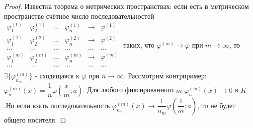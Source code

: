 \documentclass[9pt, a4paper]{article}
\begin{document}
			\begin{proof}
				Известна теорема о метрических пространствах: если есть в метрическом пространстве счётное число последовательностей 
				$\begin{matrix}
					\varphi_1^{(1)} & \varphi_2^{(1)} & \dots & \varphi_n^{(1)} & \to & \varphi^{(1)} \\
					\varphi_1^{(2)} & \varphi_2^{(2)} & \dots & \varphi_n^{(2)} & \to & \varphi^{(2)}\\
					\dots & \dots & \dots & \dots & \dots & \dots \\
					\varphi_1^{(m)} & \varphi_2^{(m)} & \dots & \varphi_n^{(m)} & \to & \varphi^{(m)}\\
					\dots & \dots & \dots & \dots & \dots & \dots \\
				\end{matrix}$
				таких, что $\varphi^{(m)} \to \varphi$ при $m\to \infty$, то $\exists \{\varphi_{n_m}^{(m)}\}$ - сходящаяся к $\varphi$ при $n \to \infty$. Рассмотрим контрпример: $\varphi_n^{(m)}(x) = \dfrac{1}{n}\varphi(\dfrac{x}{m};a )$. Для любого фиксированного $m$ $\varphi_n^{(m)} (x) \to 0$ в $K$.Но если взять последовательность $\varphi_{n_m}^{(m)}(x) \to \dfrac{1}{n_m}\varphi(\dfrac{1}{m}; a)$, то не будет общего носителя.
			\end{proof}
\end{document}
